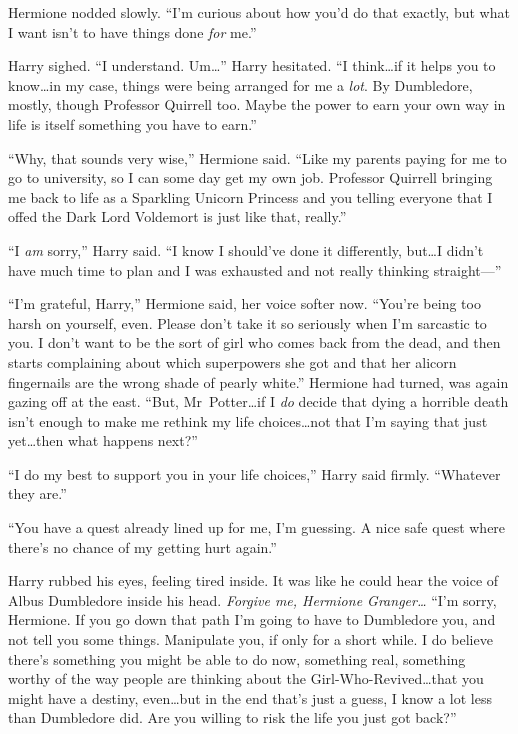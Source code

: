 Hermione nodded slowly. “I’m curious about how you’d do that exactly, but what I want isn’t to have things done \emph{for} me.”

Harry sighed. “I understand. Um…” Harry hesitated. “I think…if it helps you to know…in my case, things were being arranged for me a \emph{lot}. By Dumbledore, mostly, though Professor Quirrell too. Maybe the power to earn your own way in life is itself something you have to earn.”

“Why, that sounds very wise,” Hermione said. “Like my parents paying for me to go to university, so I can some day get my own job. Professor Quirrell bringing me back to life as a Sparkling Unicorn Princess and you telling everyone that I offed the Dark Lord Voldemort is just like that, really.”

“I \emph{am} sorry,” Harry said. “I know I should’ve done it differently, but…I didn’t have much time to plan and I was exhausted and not really thinking straight—”

“I’m grateful, Harry,” Hermione said, her voice softer now. “You’re being too harsh on yourself, even. Please don’t take it so seriously when I’m sarcastic to you. I don’t want to be the sort of girl who comes back from the dead, and then starts complaining about which superpowers she got and that her alicorn fingernails are the wrong shade of pearly white.” Hermione had turned, was again gazing off at the east. “But, Mr~Potter…if I \emph{do} decide that dying a horrible death isn’t enough to make me rethink my life choices…not that I’m saying that just yet…then what happens next?”

“I do my best to support you in your life choices,” Harry said firmly. “Whatever they are.”

“You have a quest already lined up for me, I’m guessing. A nice safe quest where there’s no chance of my getting hurt again.”

Harry rubbed his eyes, feeling tired inside. It was like he could hear the voice of Albus Dumbledore inside his head. \emph{Forgive me, Hermione Granger…} “I’m sorry, Hermione. If you go down that path I’m going to have to Dumbledore you, and not tell you some things. Manipulate you, if only for a short while. I do believe there’s something you might be able to do now, something real, something worthy of the way people are thinking about the Girl-Who-Revived…that you might have a destiny, even…but in the end that’s just a guess, I know a lot less than Dumbledore did. Are you willing to risk the life you just got back?”

